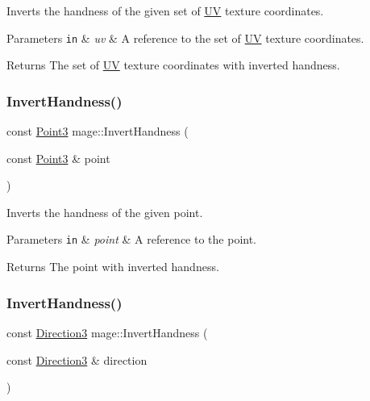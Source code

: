 Inverts the handness of the given set of \hyperlink{structmage_1_1_u_v}{UV} texture coordinates.


\begin{DoxyParams}[1]{Parameters}
\mbox{\tt in}  & {\em uv} & A reference to the set of \hyperlink{structmage_1_1_u_v}{UV} texture coordinates. \\
\hline
\end{DoxyParams}
\begin{DoxyReturn}{Returns}
The set of \hyperlink{structmage_1_1_u_v}{UV} texture coordinates with inverted handness. 
\end{DoxyReturn}
\hypertarget{namespacemage_a909b2d7d07a296a41c320b8fe8ab1b82}{}\label{namespacemage_a909b2d7d07a296a41c320b8fe8ab1b82} 
\subsubsection{\texorpdfstring{Invert\+Handness()}{InvertHandness()}\hspace{0.1cm}{\footnotesize\ttfamily [2/4]}}
{\footnotesize\ttfamily const \hyperlink{structmage_1_1_point3}{Point3} mage\+::\+Invert\+Handness (\begin{DoxyParamCaption}\item[{const \hyperlink{structmage_1_1_point3}{Point3} \&}]{point }\end{DoxyParamCaption})}

Inverts the handness of the given point.


\begin{DoxyParams}[1]{Parameters}
\mbox{\tt in}  & {\em point} & A reference to the point. \\
\hline
\end{DoxyParams}
\begin{DoxyReturn}{Returns}
The point with inverted handness. 
\end{DoxyReturn}
\hypertarget{namespacemage_a6c9899cce1f1e4d70ad74f291314a90c}{}\label{namespacemage_a6c9899cce1f1e4d70ad74f291314a90c} 
\subsubsection{\texorpdfstring{Invert\+Handness()}{InvertHandness()}\hspace{0.1cm}{\footnotesize\ttfamily [3/4]}}
{\footnotesize\ttfamily const \hyperlink{structmage_1_1_direction3}{Direction3} mage\+::\+Invert\+Handness (\begin{DoxyParamCaption}\item[{const \hyperlink{structmage_1_1_direction3}{Direction3} \&}]{direction }\end{DoxyParamCaption})}

